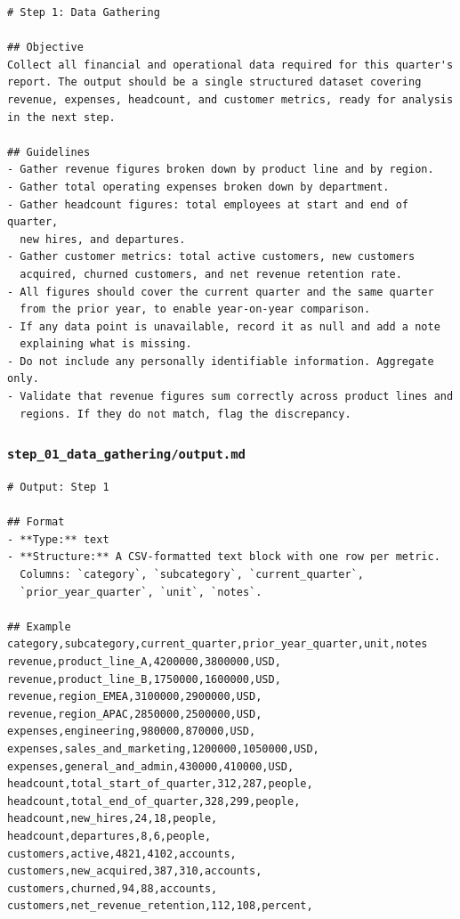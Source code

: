 \documentclass[12pt, a4paper]{article}
\begin{document}
\begin{lstlisting}[language={}]
# Step 1: Data Gathering

## Objective
Collect all financial and operational data required for this quarter's
report. The output should be a single structured dataset covering
revenue, expenses, headcount, and customer metrics, ready for analysis
in the next step.

## Guidelines
- Gather revenue figures broken down by product line and by region.
- Gather total operating expenses broken down by department.
- Gather headcount figures: total employees at start and end of quarter,
  new hires, and departures.
- Gather customer metrics: total active customers, new customers
  acquired, churned customers, and net revenue retention rate.
- All figures should cover the current quarter and the same quarter
  from the prior year, to enable year-on-year comparison.
- If any data point is unavailable, record it as null and add a note
  explaining what is missing.
- Do not include any personally identifiable information. Aggregate only.
- Validate that revenue figures sum correctly across product lines and
  regions. If they do not match, flag the discrepancy.
\end{lstlisting}

\subsubsection{\texttt{step\_01\_data\_gathering/output.md}}

\begin{lstlisting}[language={}]
# Output: Step 1

## Format
- **Type:** text
- **Structure:** A CSV-formatted text block with one row per metric.
  Columns: `category`, `subcategory`, `current_quarter`,
  `prior_year_quarter`, `unit`, `notes`.

## Example
category,subcategory,current_quarter,prior_year_quarter,unit,notes
revenue,product_line_A,4200000,3800000,USD,
revenue,product_line_B,1750000,1600000,USD,
revenue,region_EMEA,3100000,2900000,USD,
revenue,region_APAC,2850000,2500000,USD,
expenses,engineering,980000,870000,USD,
expenses,sales_and_marketing,1200000,1050000,USD,
expenses,general_and_admin,430000,410000,USD,
headcount,total_start_of_quarter,312,287,people,
headcount,total_end_of_quarter,328,299,people,
headcount,new_hires,24,18,people,
headcount,departures,8,6,people,
customers,active,4821,4102,accounts,
customers,new_acquired,387,310,accounts,
customers,churned,94,88,accounts,
customers,net_revenue_retention,112,108,percent,
\end{lstlisting}
\end{document}
